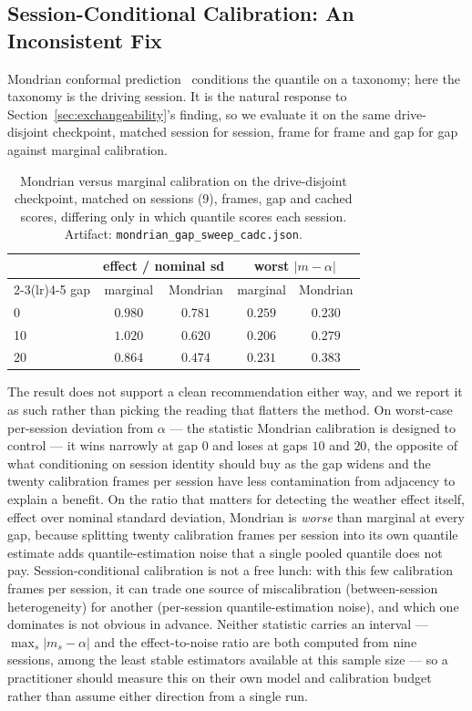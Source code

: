 \subsection{Session-Conditional Calibration: An Inconsistent Fix}
\label{sec:mondrian}

Mondrian conformal prediction~\cite{VovkMondrian2003} conditions the
quantile on a taxonomy; here the taxonomy is the driving session. It is the
natural response to Section~\ref{sec:exchangeability}'s finding, so we
evaluate it on the same drive-disjoint checkpoint, matched session for
session, frame for frame and gap for gap against marginal calibration.

\begin{table}[t]
\centering
\caption{Mondrian versus marginal calibration on the drive-disjoint
checkpoint, matched on sessions (9), frames, gap and cached scores,
differing only in which quantile scores each session. Artifact:
\texttt{mondrian\_gap\_sweep\_cadc.json}.}
\label{tab:mondrian}
\begin{tabular}{@{}lcccc@{}}
\toprule
& \multicolumn{2}{c}{effect / nominal sd} & \multicolumn{2}{c}{worst $|m - \alpha|$} \\
\cmidrule(lr){2-3}\cmidrule(lr){4-5}
gap & marginal & Mondrian & marginal & Mondrian \\
\midrule
0 & $\mathbf{0.980}$ & $0.781$ & $0.259$ & $\mathbf{0.230}$ \\
10 & $\mathbf{1.020}$ & $0.620$ & $\mathbf{0.206}$ & $0.279$ \\
20 & $\mathbf{0.864}$ & $0.474$ & $\mathbf{0.231}$ & $0.383$ \\
\bottomrule
\end{tabular}
\end{table}

The result does not support a clean recommendation either way, and we
report it as such rather than picking the reading that flatters the method.
On worst-case per-session deviation from $\alpha$ --- the statistic Mondrian
calibration is designed to control --- it wins narrowly at gap $0$ and loses
at gaps $10$ and $20$, the opposite of what conditioning on session identity
should buy as the gap widens and the twenty calibration frames per session
have less contamination from adjacency to explain a benefit. On the ratio
that matters for detecting the weather effect itself, effect over nominal
standard deviation, Mondrian is \emph{worse} than marginal at every gap,
because splitting twenty calibration frames per session into its own
quantile estimate adds quantile-estimation noise that a single pooled
quantile does not pay. Session-conditional calibration is not a free lunch:
with this few calibration frames per session, it can trade one source of
miscalibration (between-session heterogeneity) for another
(per-session quantile-estimation noise), and which one dominates is not
obvious in advance. Neither statistic carries an interval --- $\max_s
|m_s - \alpha|$ and the effect-to-noise ratio are both computed from nine
sessions, among the least stable estimators available at this sample size
--- so a practitioner should measure this on their own model and calibration
budget rather than assume either direction from a single run.

